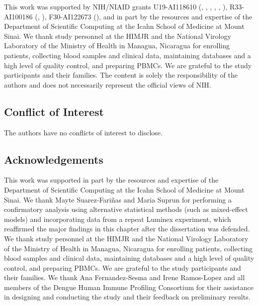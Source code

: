 This work was supported by NIH/NIAID grants U19-AI118610 (, , , , , ), R33-AI100186 (, ), F30-AI122673 (), and in part by the resources and expertise of the Department of Scientific Computing at the Icahn School of Medicine at Mount Sinai. We thank study personnel at the HIMJR and the National Virology Laboratory of the Ministry of Health in Managua, Nicaragua for enrolling patients, collecting blood samples and clinical data, maintaining databases and a high level of quality control, and preparing PBMCs. We are grateful to the study participants and their families. The content is solely the responsibility of the authors and does not necessarily represent the official views of NIH.

\subsection*{Conflict of Interest}

The authors have no conflicts of interest to disclose.

\subsection*{Acknowledgements}

This work was supported in part by the resources and expertise of the Department of Scientific Computing at the Icahn School of Medicine at Mount Sinai. We thank Mayte Suarez-Fariñas and Maria Suprun for performing a confirmatory analysis using alternative statistical methods (such as mixed-effect models) and incorporating data from a repeat Luminex experiment, which reaffirmed the major findings in this chapter after the dissertation was defended. We thank study personnel at the HIMJR and the National Virology Laboratory of the Ministry of Health in Managua, Nicaragua for enrolling patients, collecting blood samples and clinical data, maintaining databases and a high level of quality control, and preparing PBMCs. We are grateful to the study participants and their families. We thank Ana Fernandez-Sesma and Irene Ramos-Lopez and all members of the Dengue Human Immune Profiling Consortium for their assistance in designing and conducting the study and their feedback on preliminary results.
